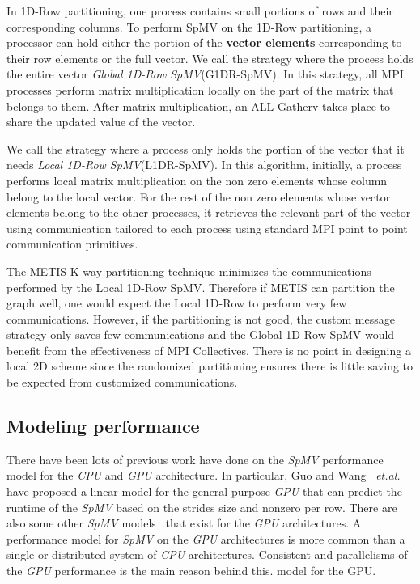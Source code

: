 \documentclass[sigconf,review,anonymous]{acmart}
\begin{document}
In 1D-Row partitioning, one process contains small portions of rows
and their corresponding columns. To perform SpMV on the 1D-Row
partitioning, a processor can hold either the portion of the \textbf{vector
  elements} corresponding to their row elements or the full vector.
We call the strategy where the process holds the entire vector \textit{Global
  1D-Row SpMV}(G1DR-SpMV). In this strategy, all MPI processes
perform matrix multiplication locally on the part of the matrix that
belongs to them. After matrix multiplication, an ALL$\_$Gatherv takes
place to share the updated value of the vector.

We call the strategy where a process only holds the portion of the
vector that it needs \textit{Local 1D-Row SpMV}(L1DR-SpMV).  In this
algorithm, initially, a process performs local matrix multiplication
on the non zero elements whose column belong to the local vector.  For
the rest of the non zero elements whose vector elements belong to the
other processes, it retrieves the relevant part of the vector using
communication tailored to each process using standard MPI point to
point communication primitives.

The METIS K-way partitioning technique minimizes the communications
performed by the Local 1D-Row SpMV. Therefore if METIS can partition
the graph well, one would expect the Local 1D-Row to perform very few
communications. However, if the partitioning is not good, the custom
message strategy only saves few communications and the Global 1D-Row
SpMV would benefit from the effectiveness of MPI Collectives. There is
no point in designing a local 2D scheme since the randomized
partitioning ensures there is little saving to be expected from
customized communications.

\subsection{Modeling performance}

There have been lots of previous work have done on the \textit{SpMV}
performance model for the \textit{CPU} and \textit{GPU}
architecture. In particular, Guo and Wang~\cite{guo2013performance}
\textit{et.al.} have proposed a linear model for the general-purpose
\textit{GPU} that can predict the runtime of the \textit{SpMV} based
on the strides size and nonzero per row. There are also some other
\textit{SpMV} models~\cite{nisa2018effective,guo2018performance} that
exist for the \textit{GPU} architectures. A performance model for
\textit{SpMV} on the \textit{GPU} architectures is more common than a
single or distributed system of \textit{CPU} architectures. Consistent
and parallelisms of the \textit{GPU} performance is the main reason
behind this.
model for the GPU. 
\end{document}
